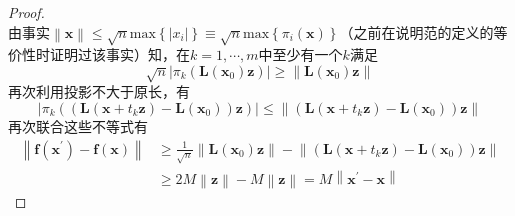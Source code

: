 \documentclass[main.tex]{subfiles}
\begin{document}
\begin{proof}
\[    \]
    由事实$\left\|\mathbf{x}\right\|\leq\sqrt{n}\mathrm{max}\left\{\left|x_i\right|\right\}\equiv\sqrt{n}\mathrm{max}\left\{\pi_i\left(\mathbf{x}\right)\right\}$（之前在说明范的定义的等价性时证明过该事实）知，在$k=1,\cdots,m$中至少有一个$k$满足
    \[
        \sqrt{n}\left|\pi_k\left(\mathbf{L}\left(\mathbf{x}_0\right)\mathbf{z}\right)\right|\geq\left\|\mathbf{L}\left(\mathbf{x}_0\right)\mathbf{z}\right\|
    \]
    再次利用投影不大于原长，有
    \[
        \left|\pi_k\left(\left(\mathbf{L}\left(\mathbf{x}+t_k\mathbf{z}\right)-\mathbf{L}\left(\mathbf{x}_0\right)\right)\mathbf{z}\right)\right|\leq\left\|\left(\mathbf{L}\left(\mathbf{x}+t_k\mathbf{z}\right)-\mathbf{L}\left(\mathbf{x}_0\right)\right)\mathbf{z}\right\|\]
    再次联合这些不等式有
    \begin{align*}
        \left\|\mathbf{f}\left(\mathbf{x}^\prime\right)-\mathbf{f}\left(\mathbf{x}\right)\right\| & \geq\frac{1}{\sqrt{n}}\left\|\mathbf{L}\left(\mathbf{x}_0\right)\mathbf{z}\right\|-\left\|\left(\mathbf{L}\left(\mathbf{x}+t_k\mathbf{z}\right)-\mathbf{L}\left(\mathbf{x}_0\right)\right)\mathbf{z}\right\| \\
                                                                                                  & \geq2M\left\|\mathbf{z}\right\|-M\left\|\mathbf{z}\right\|=M\left\|\mathbf{x}^\prime-\mathbf{x}\right\|
    \end{align*}
\end{proof}
\end{document}
